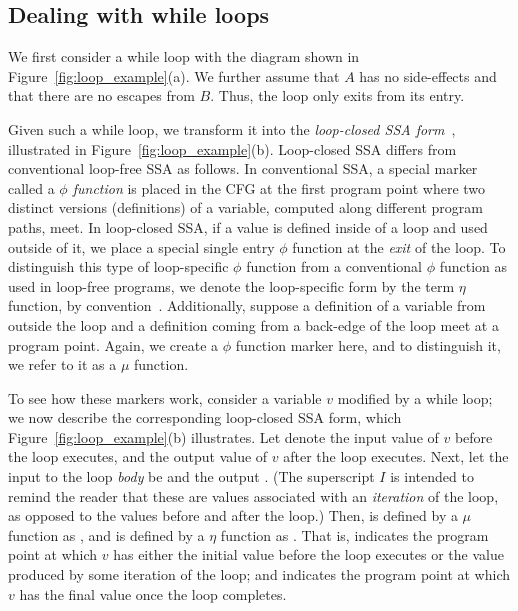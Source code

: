 \subsection{Dealing with while loops}
\label{sec:while-loops}

We first consider a while loop with the diagram shown in Figure~\ref{fig:loop_example}(a).
We further assume that $A$ has no side-effects %
%
%
and that there are no escapes from $B$.
Thus, the loop only exits from its entry.  

Given such a while loop, we transform it into the \emph{loop-closed SSA form}~\cite{Pop2009}, illustrated in Figure~\ref{fig:loop_example}(b).
Loop-closed SSA differs from conventional loop-free SSA as follows.
In conventional SSA, a special marker called a \emph{$\phi$ function} is placed in the CFG at the first program point where two distinct versions (definitions) of a variable, computed along different program paths, meet.
%
In loop-closed SSA, if a value is defined inside of a loop and used outside of it, we place a special single entry $\phi$ function at the \emph{exit} of the loop.
To distinguish this type of loop-specific $\phi$ function from a conventional $\phi$ function as used in loop-free programs, we denote the loop-specific form by the term $\eta$ function, by convention~\cite{RobertA.Ballance1990}.
Additionally, suppose a definition of a variable from outside the loop and a definition coming from a back-edge of the loop meet at a program point.
Again, we create a $\phi$ function marker here, and to distinguish it, we refer to it as a $\mu$ function.

To see how these markers work, consider a variable $v$ modified by a while loop;
we now describe the corresponding loop-closed SSA form, which Figure~\ref{fig:loop_example}(b) illustrates.
Let \vinit denote the input value of $v$ before the loop executes, and \vfinal the output value of $v$ after the loop executes.
Next, let the input to the loop \emph{body} be \vmu and the output \viter.
(The superscript $I$ is intended to remind the reader that these are values associated with an \emph{iteration} of the loop, as opposed to the values before and after the loop.)
Then, \vmu is defined by a $\mu$ function as \mufunc, and \vfinal is defined by a $\eta$ function as \etafunc.
That is, \mufunc indicates the program point at which $v$ has either the initial value before the loop executes or the value produced by some iteration of the loop;
and \etafunc indicates the program point at which $v$ has the final value once the loop completes.

